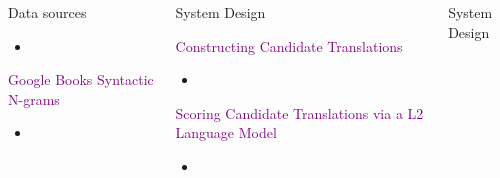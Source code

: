 \documentclass[final,t]{beamer}
\begin{document}
\begin{frame}{}
\begin{columns}[t]
\begin{column}{.31\linewidth}
\begin{block}{Data sources}
\colorbox{light-gray}{
\begin{minipage}{.90\linewidth}
\begin{itemize}
\item
\end{itemize}
\end{minipage}
}

\begin{center}
\textcolor{purple}{Google Books Syntactic N-grams}
\end{center}

\colorbox{light-gray}{
\begin{minipage}{.90\linewidth}
\begin{itemize}
\item
\end{itemize}
\end{minipage}
}

\end{block}

\end{column}

\begin{column}{.64\linewidth}

\begin{columns}
\begin{column}{.48\linewidth}

\begin{block}{System Design}

\begin{center}
  \textcolor{purple}{Constructing Candidate Translations}
  \begin{itemize}
  \item 
  \end{itemize}

  \textcolor{purple}{Scoring Candidate Translations via a L2 Language Model}
  \begin{itemize}
  \item 
  \end{itemize}

\end{center}

\end{block}

\end{column}

\begin{column}{.48\linewidth}

\begin{block}{System Design}
\begin{center}


\end{center}
\end{block}
\end{column}
\end{columns}
\end{column}
\end{columns}
\end{frame}
\end{document}
